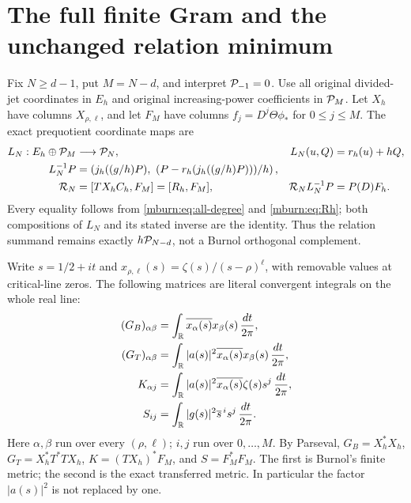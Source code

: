 \documentclass[11pt]{article}
\begin{document}
\section{The full finite Gram and the unchanged relation minimum}

Fix $N\geq d-1$, put $M=N-d$, and interpret $\mathcal P_{-1}=0$.
Use all original divided-jet coordinates in $E_h$ and original
increasing-power coefficients in $\mathcal P_M$. Let $X_h$ have columns
$X_{\rho,\ell}$, and let $F_M$ have columns
$f_j=D^j\Theta\phi_*$ for $0\leq j\leq M$. The exact
prequotient coordinate maps are
\begin{equation}\label{mburn:eq:LN}
 \begin{aligned}
 L_N:E_h\oplus\mathcal P_M&\longrightarrow\mathcal P_N,&
 L_N(u,Q)&=r_h(u)+hQ,\\
 L_N^{-1}P&=\left(j_h((g/h)P),\ (P-r_h(j_h((g/h)P)))/h\right),\\
 \mathcal R_N&=[T X_hC_h,F_M]=[R_h,F_M],&
 \mathcal R_NL_N^{-1}P&=P(D)F_h.
 \end{aligned}
\end{equation}
Every equality follows from \eqref{mburn:eq:all-degree} and
\eqref{mburn:eq:Rh}; both compositions of $L_N$ and its stated
inverse are the identity. Thus the relation summand remains
exactly $h\mathcal P_{N-d}$, not a Burnol orthogonal complement.

Write $s=1/2+it$ and
$x_{\rho,\ell}(s)=\zeta(s)/(s-\rho)^\ell$, with removable
values at critical-line zeros. The following matrices are literal
convergent integrals on the whole real line:
\begin{equation}\label{mburn:eq:grams}
 \begin{aligned}
 (G_B)_{\alpha\beta}
   &=\int_\mathbb R\overline{x_\alpha(s)}x_\beta(s)\,\frac{dt}{2\pi},\\
 (G_T)_{\alpha\beta}
   &=\int_\mathbb R|a(s)|^2\overline{x_\alpha(s)}x_\beta(s)\,\frac{dt}{2\pi},\\
 K_{\alpha j}
   &=\int_\mathbb R|a(s)|^2\overline{x_\alpha(s)}\zeta(s)s^j\,\frac{dt}{2\pi},\\
 S_{ij}
   &=\int_\mathbb R|g(s)|^2\overline{s}^{\,i}s^j\,\frac{dt}{2\pi}.
 \end{aligned}
\end{equation}
Here $\alpha,\beta$ run over every $(\rho,\ell)$; $i,j$ run
over $0,\ldots,M$. By Parseval, $G_B=X_h^*X_h$,
$G_T=X_h^*T^*TX_h$, $K=(TX_h)^*F_M$, and $S=F_M^*F_M$.
The first is Burnol's finite metric; the second is the exact
transferred metric. In particular the factor $|a(s)|^2$ is not
replaced by one.
\end{document}
